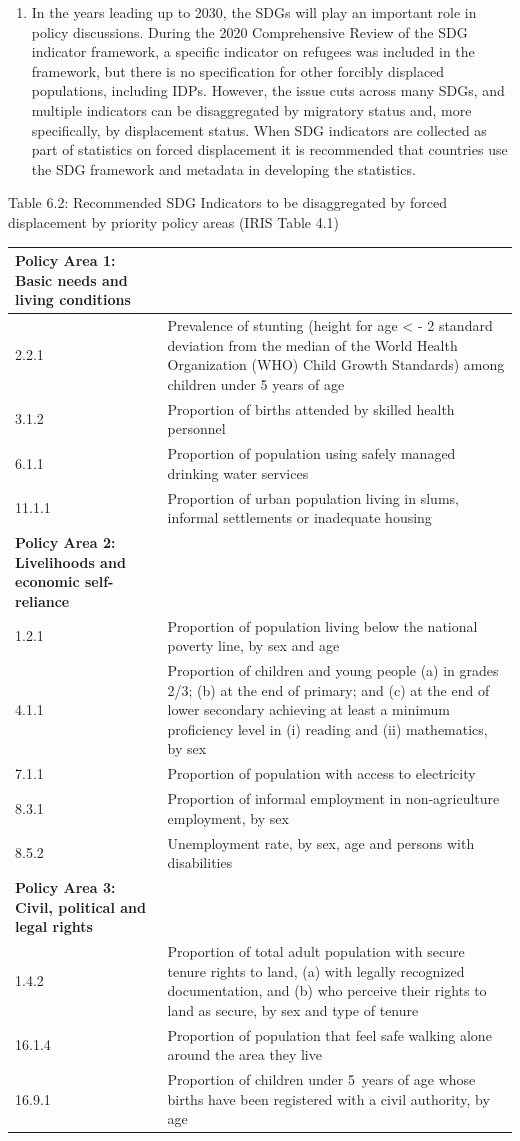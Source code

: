 \documentclass[
]{article}
\providecommand{\tightlist}{%
  \setlength{\itemsep}{0pt}\setlength{\parskip}{0pt}}
\begin{document}
\begin{enumerate}
\def\labelenumi{\arabic{enumi}.}
\setcounter{enumi}{423}
\tightlist
\item
  In the years leading up to 2030, the SDGs will play an important
  role in policy discussions. During the 2020 Comprehensive Review of
  the SDG indicator framework, a specific indicator on refugees was
  included in the framework, but there is no specification for other
  forcibly displaced populations, including IDPs. However, the issue
  cuts across many SDGs, and multiple indicators can be disaggregated
  by migratory status and, more specifically, by displacement status.
  When SDG indicators are collected as part of statistics on forced
  displacement it is recommended that countries use the SDG framework
  and metadata in developing the statistics.
\end{enumerate}

Table 6.2: Recommended SDG Indicators to be disaggregated by forced
displacement by priority policy areas (IRIS Table 4.1)

\begin{longtable}[]{@{}ll@{}}
\toprule
\textbf{Policy Area 1: Basic needs and living conditions} &\tabularnewline
\midrule
\endhead
2.2.1 & Prevalence of stunting (height for age \textless{} - 2 standard deviation from the median of the World Health Organization (WHO) Child Growth Standards) among children under 5 years of age\tabularnewline
3.1.2 & Proportion of births attended by skilled health personnel\tabularnewline
6.1.1 & Proportion of population using safely managed drinking water services\tabularnewline
11.1.1 & Proportion of urban population living in slums, informal settlements or inadequate housing\tabularnewline
\textbf{Policy Area 2: Livelihoods and economic self-reliance} &\tabularnewline
1.2.1 & Proportion of population living below the national poverty line, by sex and age\tabularnewline
4.1.1 & Proportion of children and young people (a) in grades 2/3; (b) at the end of primary; and (c) at the end of lower secondary achieving at least a minimum proficiency level in (i) reading and (ii) mathematics, by sex\tabularnewline
7.1.1 & Proportion of population with access to electricity\tabularnewline
8.3.1 & Proportion of informal employment in non‑agriculture employment, by sex\tabularnewline
8.5.2 & Unemployment rate, by sex, age and persons with disabilities\tabularnewline
\textbf{Policy Area 3: Civil, political and legal rights} &\tabularnewline
1.4.2 & Proportion of total adult population with secure tenure rights to land, (a) with legally recognized documentation, and (b) who perceive their rights to land as secure, by sex and type of tenure\tabularnewline
16.1.4 & Proportion of population that feel safe walking alone around the area they live\tabularnewline
16.9.1 & Proportion of children under 5~years of age whose births have been registered with a civil authority, by age\tabularnewline
\bottomrule
\end{longtable}
\end{document}
